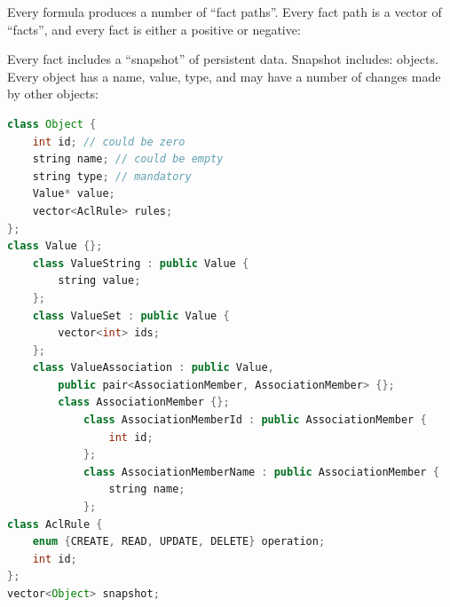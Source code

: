 \documentclass[12pt,oneside,letterpaper]{article}
\begin{document}
    Every formula produces a number of ``fact paths''. Every fact path
    is a vector of ``facts'', and every fact is either a positive or negative:


    Every fact includes a ``snapshot'' of persistent data. Snapshot includes:
    objects. Every object
    has a name, value, type,
    and may have a number of changes made by other objects:

    \begin{lstlisting}[language=Java]
class Object {
    int id; // could be zero
    string name; // could be empty
    string type; // mandatory
    Value* value;
    vector<AclRule> rules;
};
class Value {};
    class ValueString : public Value {
        string value;
    };
    class ValueSet : public Value {
        vector<int> ids;
    };
    class ValueAssociation : public Value,
        public pair<AssociationMember, AssociationMember> {};
        class AssociationMember {};
            class AssociationMemberId : public AssociationMember {
                int id;
            };
            class AssociationMemberName : public AssociationMember {
                string name;
            };
class AclRule {
    enum {CREATE, READ, UPDATE, DELETE} operation;
    int id;
};
vector<Object> snapshot;
\end{lstlisting}
\end{document}
